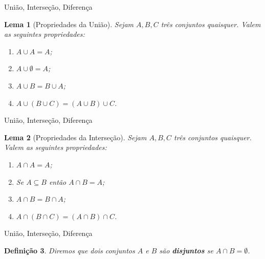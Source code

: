 \documentclass[10pt]{beamer}
\renewcommand{\indent}{\hspace*{2em}}
\theoremstyle{plain}
\newtheorem{defn}{Definição}[section]
\newtheorem{lem}[defn]{Lema}
\begin{document}
\begin{frame}{União, Interseção, Diferença}
\begin{lem}[Propriedades da União]
\vfill\indent Sejam $A,B,C$ três conjuntos quaisquer. Valem as seguintes propriedades:
 \begin{enumerate}[i -]
     \item $A\cup A=A$;
     \item $A\cup\emptyset=A$;
     \item $A\cup B=B\cup A$;
     \item $A\cup(B\cup C)=(A\cup B)\cup C$.
 \end{enumerate}
\end{lem}
\end{frame}

\begin{frame}{União, Interseção, Diferença}
\begin{lem}[Propriedades da Interseção]
 \vfill\indent Sejam $A,B,C$ três conjuntos quaisquer. Valem as seguintes propriedades:
 \begin{enumerate}[i -]
     \item $A\cap A=A$;
     \item Se $A\subseteq B$ então $A\cap B=A$;
     \item $A\cap B=B\cap A$;
     \item $A\cap(B\cap C)=(A\cap B)\cap C$.
 \end{enumerate}
\end{lem}
\end{frame}

\begin{frame}{União, Interseção, Diferença}
\begin{defn}
 \vfill\indent Diremos que dois conjuntos $A$ e $B$ são \textbf{disjuntos} se $A\cap B=\emptyset$.
\end{defn}
\end{frame}
\end{document}

